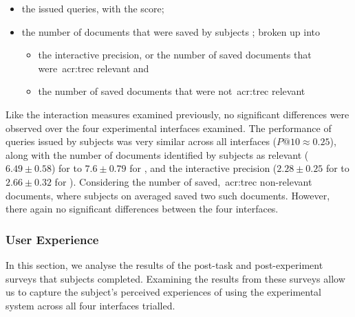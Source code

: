 \begin{itemize}
    \item{the issued queries, with the  score;}
    \item{the number of documents that were saved by subjects ; broken up into}
    
    \begin{itemize}
        \item{the interactive precision, or the number of saved documents that were~\gls{acr:trec} relevant  and}
        \item{the number of saved documents that were not~\gls{acr:trec} relevant }
    \end{itemize}
\end{itemize}

Like the interaction measures examined previously, no significant differences were observed over the four experimental interfaces examined. The performance of queries issued by subjects was very similar across all interfaces ($P@10 \approx 0.25$), along with the number of documents identified by subjects as relevant ($6.49\pm0.58$) for  to $7.6\pm0.79$ for , and the interactive precision ($2.28\pm0.25$ for  to $2.66\pm0.32$ for ). Considering the number of saved,~\gls{acr:trec} non-relevant documents, where subjects on averaged saved two such documents. However, there again no significant differences between the four interfaces.

\subsubsection{User Experience}\label{chap:snippets:user:results:ux}
In this section, we analyse the results of the post-task and post-experiment surveys that subjects completed. Examining the results from these surveys allow us to capture the subject's perceived experiences of using the experimental system across all four interfaces trialled.

